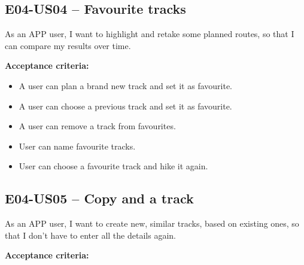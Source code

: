 \subsection*{E04-US04 -- Favourite tracks}
As an APP user, I want to highlight and retake some planned routes, so that I can compare my results over time.

\textbf{Acceptance criteria:}
\begin{itemize}
    \item A user can plan a brand new track and set it as favourite.
    \item A user can choose a previous track and set it as favourite.
    \item A user can remove a track from favourites.
    \item User can name favourite tracks.
    \item User can choose a favourite track and hike it again.
\end{itemize}

\subsection*{E04-US05 -- Copy and a track}
As an APP user, I want to create new, similar tracks, based on existing ones, so that I don't have to enter all the details again.

\textbf{Acceptance criteria:}
\begin{itemize}
    
\end{itemize}
